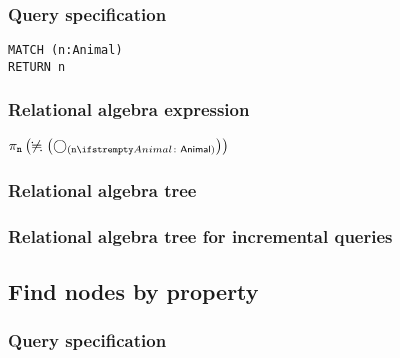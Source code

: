 \subsubsection*{Query specification}

\begin{lstlisting}
MATCH (n:Animal)
RETURN n
\end{lstlisting}

\subsubsection*{Relational algebra expression}

$\projection{\var{n}} \left(\alldifferent{} \left(\getvertices{n}{Animal}\right)\right)$

\subsubsection*{Relational algebra tree}


\subsubsection*{Relational algebra tree for incremental queries}


\subsection{Find nodes by property}

\subsubsection*{Query specification}

